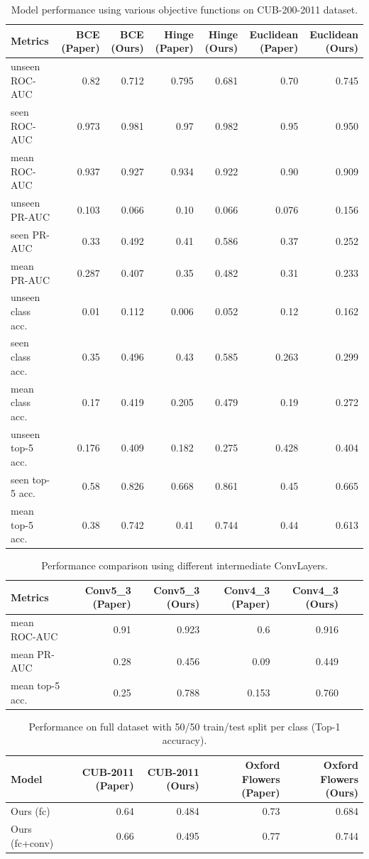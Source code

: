 \documentclass[11pt]{article}
\begin{document}
\begin{table}[t]
\centering
\scriptsize
\caption{Model performance using various objective functions on CUB-200-2011 dataset.}
\label{tab:table2}
\begin{tabular}{lrrrrrr}
\toprule
Metrics & BCE (Paper) & BCE (Ours) & Hinge (Paper) & Hinge (Ours) & Euclidean (Paper) & Euclidean (Ours) \\ \midrule
unseen ROC-AUC & 0.82 & 0.712 & 0.795 & 0.681 & 0.70 & 0.745 \\
seen ROC-AUC & 0.973 & 0.981 & 0.97 & 0.982 & 0.95 & 0.950 \\
mean ROC-AUC & 0.937 & 0.927 & 0.934 & 0.922 & 0.90 & 0.909 \\
unseen PR-AUC & 0.103 & 0.066 & 0.10 & 0.066 & 0.076 & 0.156 \\
seen PR-AUC & 0.33 & 0.492 & 0.41 & 0.586 & 0.37 & 0.252 \\
mean PR-AUC & 0.287 & 0.407 & 0.35 & 0.482 & 0.31 & 0.233 \\
unseen class acc. & 0.01 & 0.112 & 0.006 & 0.052 & 0.12 & 0.162 \\
seen class acc. & 0.35 & 0.496 & 0.43 & 0.585 & 0.263 & 0.299 \\
mean class acc. & 0.17 & 0.419 & 0.205 & 0.479 & 0.19 & 0.272 \\
unseen top-5 acc. & 0.176 & 0.409 & 0.182 & 0.275 & 0.428 & 0.404 \\
seen top-5 acc. & 0.58 & 0.826 & 0.668 & 0.861 & 0.45 & 0.665 \\
mean top-5 acc. & 0.38 & 0.742 & 0.41 & 0.744 & 0.44 & 0.613 \\
 \bottomrule
\end{tabular}
\end{table}


\begin{table}[t]
\centering
\scriptsize
\caption{Performance comparison using different intermediate ConvLayers.}
\label{tab:table3}
\begin{tabular}{lrrrrrr}
\toprule
Metrics & Conv5\_3 (Paper) & Conv5\_3 (Ours) & Conv4\_3 (Paper) & Conv4\_3 (Ours) \\ \midrule
mean ROC-AUC & 0.91 & 0.923 & 0.6 & 0.916 \\
mean PR-AUC & 0.28 & 0.456 & 0.09 & 0.449 \\
mean top-5 acc. & 0.25 & 0.788 & 0.153 & 0.760 \\
 \bottomrule
\end{tabular}
\end{table}


\begin{table}[t]
\centering
\scriptsize
\caption{Performance on full dataset with 50/50 train/test split per class (Top-1 accuracy).}
\label{tab:table4}
\begin{tabular}{lrrrr}
\toprule
Model & CUB-2011 (Paper) & CUB-2011 (Ours) & Oxford Flowers (Paper) & Oxford Flowers (Ours) \\ \midrule
Ours (fc) & 0.64 & 0.484 & 0.73 & 0.684 \\
Ours (fc+conv) & 0.66 & 0.495 & 0.77 & 0.744 \\
 \bottomrule
\end{tabular}
\end{table}
\end{document}
